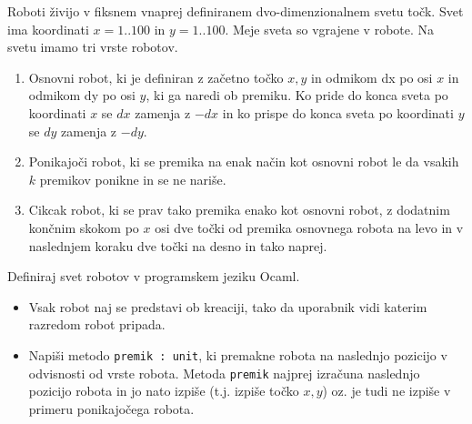 \begin{ex}
Roboti \v zivijo v fiksnem vnaprej definiranem dvo-dimenzionalnem svetu to\v ck. Svet ima koordinati $x=1..100$ in $y=1..100$. Meje sveta so vgrajene v robote. Na svetu imamo tri vrste robotov.

\begin{enumerate}
\item Osnovni robot, ki je definiran z za\v cetno to\v cko $x,y$ in odmikom dx po osi $x$ in odmikom dy po osi $y$, ki ga naredi ob premiku. Ko pride do konca sveta po koordinati $x$ se $dx$ zamenja z $-dx$ in ko prispe do konca sveta po koordinati $y$ se $dy$ zamenja z $-dy$.

\item Ponikajo\v ci robot, ki se premika na enak na\v cin kot osnovni robot le da vsakih $k$ premikov ponikne in se ne nari\v se.

\item Cikcak robot, ki se prav tako premika enako kot osnovni robot, z dodatnim kon\v cnim skokom po $x$ osi dve to\v cki od premika osnovnega robota na levo in v naslednjem koraku dve to\v cki na desno in tako naprej.
\end{enumerate}

Definiraj svet robotov v programskem jeziku Ocaml. 
\begin{itemize}
\item Vsak robot naj se predstavi ob kreaciji, tako da uporabnik vidi katerim razredom robot pripada.

\item Napi\v si metodo \lstinline{premik : unit}, ki premakne robota na naslednjo pozicijo v odvisnosti od vrste robota. Metoda \lstinline{premik} najprej izra\v cuna naslednjo pozicijo robota in jo nato izpi\v se (t.j. izpi\v se to\v cko $x,y$) oz. je tudi ne izpi\v se v primeru ponikajo\v cega robota.
\end{itemize}
\end{ex}



